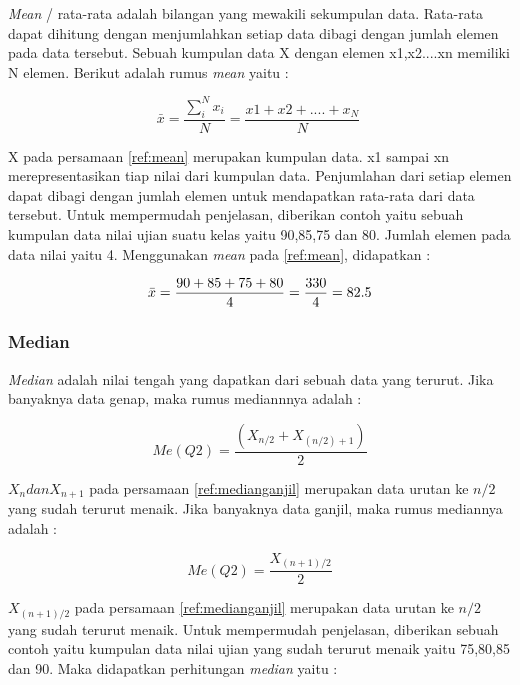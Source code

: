\documentclass[a4paper,twoside]{article}
\begin{document}
\begin{enumerate}
\textit{Mean} / rata-rata adalah bilangan yang mewakili sekumpulan data. Rata-rata dapat dihitung dengan menjumlahkan setiap data dibagi dengan jumlah elemen pada data tersebut. Sebuah kumpulan data X dengan elemen x1,x2....xn memiliki N elemen. Berikut adalah rumus \textit{mean} yaitu : 

\begin{equation}
\bar{x} = \frac{\sum_{i}^{N}x_i}{N} = \frac{x1+x2+....+x_N}{N} \
\label{ref:mean}
\end{equation}

X pada persamaan \ref{ref:mean} merupakan kumpulan data. x1 sampai xn merepresentasikan tiap nilai dari kumpulan data. Penjumlahan dari setiap elemen dapat dibagi dengan jumlah elemen untuk mendapatkan rata-rata dari data tersebut. Untuk mempermudah penjelasan, diberikan contoh yaitu sebuah kumpulan data nilai ujian suatu kelas yaitu 90,85,75 dan 80. Jumlah elemen pada data nilai yaitu 4. Menggunakan \textit{mean} pada \ref{ref:mean}, didapatkan : 

\begin{displaymath}
\bar{x} = \frac{90+85+75+80}{4} \\
= \frac{330}{4} = 82.5
\end{displaymath}


\subsubsection{Median}
\textit{Median} adalah nilai tengah yang dapatkan dari sebuah data yang terurut. Jika banyaknya data genap, maka rumus mediannnya adalah : 

\begin{equation}
Me(Q2) = \frac{(X_{n/2} + X_{(n/2)+1})}{2}
\label{ref:mediangenap}
\end{equation}
	
$X_n dan X_{n+1}$ pada persamaan \ref{ref:medianganjil} merupakan data urutan ke $n/2$ yang sudah terurut menaik. Jika banyaknya data ganjil, maka rumus mediannya adalah : 

\begin{equation}
Me(Q2) = \frac{X_{(n+1)/2}}{2}
\label{ref:medianganjil}
\end{equation}

 $X_{(n+1)/2}$ pada persamaan \ref{ref:medianganjil} merupakan data urutan ke $n/2$ yang sudah terurut menaik. Untuk mempermudah penjelasan, diberikan sebuah contoh yaitu kumpulan data nilai ujian yang sudah terurut menaik yaitu 75,80,85 dan 90. Maka didapatkan perhitungan \textit{median} yaitu :
 

\end{enumerate}
\end{document}
